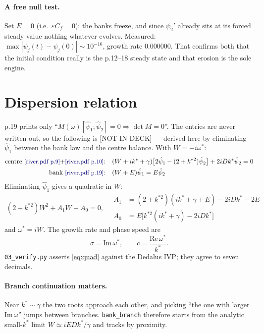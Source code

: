 \documentclass[11pt]{article}
\newcommand{\code}[1]{\texttt{\small #1}}
\newcommand{\deck}[1]{{\color{blue!45!black}\small[river.pdf p.#1]}}
\newcommand{\notdeck}{{\color{red!55!black}\small[NOT IN DECK]}}
\newcommand{\pt}{\psi_2'}
\newcommand{\ks}{k^{*}}
\newcommand{\kss}{k^{*2}}   %
\begin{document}
\paragraph{A free null test.} Set $E=0$ (i.e.\ $\varepsilon C_f=0$): the banks freeze,
and since $\pt$ already sits at its forced steady value nothing whatever evolves.
Measured: $\max|\psi_j(t)-\psi_j(0)|\sim10^{-16}$, growth rate $0.000000$. That confirms
both that the initial condition really is the p.12--18 steady state and that erosion is
the sole engine.

\section{Dispersion relation}
\label{sec:disp}

p.19 prints only ``$M(\omega)[\hat\psi_1;\hat\psi_2]=0\Rightarrow\det M=0$''. The entries
are never written out, so the following is \notdeck{} --- derived here by eliminating
$\hat\psi_1$ between the bank law and the centre balance. With $W=-i\omega^{*}$:
\begin{align}
  \text{centre \deck{9}+\deck{10}:}\quad&
  (W+i\ks+\gamma)\bigl[2\hat\psi_1-(2+\kss)\hat\psi_2\bigr]+2iD\ks\hat\psi_2=0\\
  \text{bank \deck{19}:}\quad& (W+E)\hat\psi_1=E\hat\psi_2
\end{align}
Eliminating $\hat\psi_1$ gives a quadratic in $W$:
\begin{equation}
  \boxed{\;(2+\kss)W^{2}+A_1W+A_0=0,\quad
  \begin{aligned}
    A_1&=(2+\kss)(i\ks+\gamma+E)-2iD\ks-2E\\
    A_0&=E\bigl[\kss(i\ks+\gamma)-2iD\ks\bigr]
  \end{aligned}\;}
  \label{eq:quad}
\end{equation}
and $\omega^{*}=iW$. The growth rate and phase speed are
\begin{equation}
  \sigma=\mathrm{Im}\,\omega^{*},\qquad c=\frac{\mathrm{Re}\,\omega^{*}}{\ks}.
\end{equation}
\code{03\_verify.py} asserts \eqref{eq:quad} against the Dedalus IVP; they agree to seven
decimals.

\paragraph{Branch continuation matters.} Near $\ks\sim\gamma$ the two roots approach each
other, and picking ``the one with larger $\mathrm{Im}\,\omega$'' jumps between branches.
\code{bank\_branch} therefore starts from the analytic small-$\ks$ limit
$W\simeq iED\ks/\gamma$ and tracks by proximity.
\end{document}
